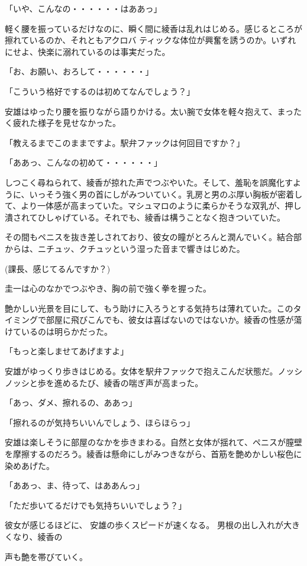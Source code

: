 ﻿\documentclass[book,tate]{jlreq}
\begin{document}
「いや、こんなの・・・・・・はああっ」

軽く腰を振っているだけなのに、瞬く間に綾香は乱れはじめる。感じるところが擦れているのか、それともアクロバ ティックな体位が興奮を誘うのか。いずれにせよ、快楽に溺れているのは事実だった。

「お、お願い、おろして・・・・・・」

「こういう格好でするのは初めてなんでしょう？」

安雄はゆったり腰を振りながら語りかける。太い腕で女体を軽々抱えて、まったく疲れた様子を見せなかった。

「教えるまでこのままですよ。駅弁ファックは何回目ですか？」

「ああっ、こんなの初めて・・・・・・」

しつこく尋ねられて、綾香が掠れた声でつぶやいた。そして、羞恥を誤魔化すように、いっそう強く男の首にしがみついていく。乳房と男のぶ厚い胸板が密着して、より一体感が高まっていた。マシュマロのように柔らかそうな双乳が、押し潰されてひしゃげている。それでも、綾香は構うことなく抱きついていた。

その間もペニスを抜き差しされており、彼女の瞳がとろんと潤んでいく。結合部からは、ニチュッ、クチュッという湿った音まで響きはじめた。

(課長、感じてるんですか？)

圭一は心のなかでつぶやき、胸の前で強く拳を握った。

艶かしい光景を目にして、もう助けに入ろうとする気持ちは薄れていた。このタイミングで部屋に飛びこんでも、彼女は喜ばないのではないか。綾香の性感が蕩けているのは明らかだった。

「もっと楽しませてあげますよ」

安雄がゆっくり歩きはじめる。女体を駅弁ファックで抱えこんだ状態だ。ノッシノッシと歩を進めるたび、綾香の喘ぎ声が高まった。

「あっ、ダメ、擦れるの、ああっ」

「擦れるのが気持ちいいんでしょう、ほらほらっ」

安雄は楽しそうに部屋のなかを歩きまわる。自然と女体が揺れて、ペニスが膣壁を摩擦するのだろう。綾香は懸命にしがみつきながら、首筋を艶めかしい桜色に染めあげた。

「ああっ、ま、待って、はああんっ」

「ただ歩いてるだけでも気持ちいいでしょう？」

彼女が感じるほどに、 安雄の歩くスピードが速くなる。 男根の出し入れが大きくなり、綾香の

声も艶を帯びていく。
\end{document}
